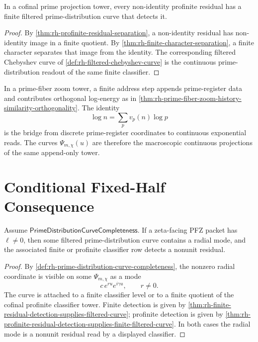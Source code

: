\begin{theorem}
\label{thm:rh-profinite-residual-detection-supplies-finite-filtered-curve}
In a cofinal prime projection tower, every non-identity profinite
residual has a finite filtered prime-distribution curve that detects it.
\end{theorem}

\begin{proof}
By \autoref{thm:rh-profinite-residual-separation}, a non-identity
residual has non-identity image in a finite quotient.  By
\autoref{thm:rh-finite-character-separation}, a finite character
separates that image from the identity.  The corresponding filtered
Chebyshev curve of
\autoref{def:rh-filtered-chebyshev-curve} is the continuous
prime-distribution readout of the same finite classifier.
\end{proof}

\begin{principle}
\label{prin:rh-distribution-curves-macroscopic-pfz-readout}
In a prime-fiber zoom tower, a finite address step appends prime-register
data and contributes orthogonal log-energy as in
\autoref{thm:rh-prime-fiber-zoom-history-similarity-orthogonality}.  The
identity
$$
\log n=\sum_p v_p(n)\log p
$$
is the bridge from discrete prime-register coordinates to continuous
exponential reads.  The curves $\Psi_{m,\chi}(u)$ are therefore the
macroscopic continuous projections of the same append-only tower.
\end{principle}

\section{Conditional Fixed-Half Consequence}
\label{sec:rh-prime-distribution-conditional-fixed-half}

\begin{theorem}
\label{thm:rh-distribution-curve-completeness-radial-residual-visibility}
Assume $\mathsf{PrimeDistributionCurveCompleteness}$.  If a zeta-facing
PFZ packet has $\ell\ne0$, then some filtered prime-distribution curve
contains a radial mode, and the associated finite or profinite
classifier row detects a nonunit residual.
\end{theorem}

\begin{proof}
By \autoref{def:rh-prime-distribution-curve-completeness}, the nonzero
radial coordinate is visible on some $\Psi_{m,\chi}$ as a mode
$$
c\,e^{ru}e^{i\gamma u},
\qquad
r\ne0.
$$
The curve is attached to a finite classifier level or to a finite
quotient of the cofinal profinite classifier tower.  Finite detection is
given by \autoref{thm:rh-finite-residual-detection-supplies-filtered-curve};
profinite detection is given by
\autoref{thm:rh-profinite-residual-detection-supplies-finite-filtered-curve}.
In both cases the radial mode is a nonunit residual read by a displayed
classifier.
\end{proof}

